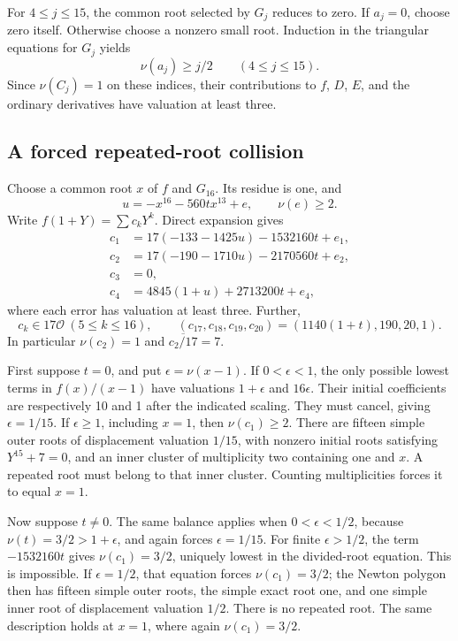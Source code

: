 \documentclass[
  british,
  10pt,
  a4paper,
]{article}
\begin{document}
For \(4\le j\le15\), the common root selected by \(G_j\) reduces to
zero. If \(a_j=0\), choose zero itself. Otherwise choose a nonzero small
root. Induction in the triangular equations for \(G_j\) yields \[
\nu(a_j)\ge j/2\qquad(4\le j\le15).
\] Since \(\nu(C_j)=1\) on these indices, their contributions to \(f\),
\(D\), \(E\), and the ordinary derivatives have valuation at least
three.

\subsection{A forced repeated-root
collision}\label{a-forced-repeated-root-collision}

Choose a common root \(x\) of \(f\) and \(G_{16}\). Its residue is one,
and \[
u=-x^{16}-560t x^{13}+e,\qquad \nu(e)\ge2.
\] Write \(f(1+Y)=\sum c_kY^k\). Direct expansion gives \[
\begin{aligned}
c_1&=17(-133-1425u)-1532160t+e_1,\\
c_2&=17(-190-1710u)-2170560t+e_2,\\
c_3&=0,\\
c_4&=4845(1+u)+2713200t+e_4,
\end{aligned}
\] where each error has valuation at least three. Further, \[
c_k\in17\mathcal O\ (5\le k\le16),\qquad
(c_{17},c_{18},c_{19},c_{20})=(1140(1+t),190,20,1).
\] In particular \(\nu(c_2)=1\) and \(\overline{c_2/17}=7\).

First suppose \(t=0\), and put \(\epsilon=\nu(x-1)\). If
\(0<\epsilon<1\), the only possible lowest terms in \(f(x)/(x-1)\) have
valuations \(1+\epsilon\) and \(16\epsilon\). Their initial coefficients
are respectively 10 and 1 after the indicated scaling. They must cancel,
giving \(\epsilon=1/15\). If \(\epsilon\ge1\), including \(x=1\), then
\(\nu(c_1)\ge2\). There are fifteen simple outer roots of displacement
valuation \(1/15\), with nonzero initial roots satisfying
\(Y^{15}+7=0\), and an inner cluster of multiplicity two containing one
and \(x\). A repeated root must belong to that inner cluster. Counting
multiplicities forces it to equal \(x=1\).

Now suppose \(t\ne0\). The same balance applies when \(0<\epsilon<1/2\),
because \(\nu(t)=3/2>1+\epsilon\), and again forces \(\epsilon=1/15\).
For finite \(\epsilon>1/2\), the term \(-1532160t\) gives
\(\nu(c_1)=3/2\), uniquely lowest in the divided-root equation. This is
impossible. If \(\epsilon=1/2\), that equation forces \(\nu(c_1)=3/2\);
the Newton polygon then has fifteen simple outer roots, the simple exact
root one, and one simple inner root of displacement valuation \(1/2\).
There is no repeated root. The same description holds at \(x=1\), where
again \(\nu(c_1)=3/2\).
\end{document}
